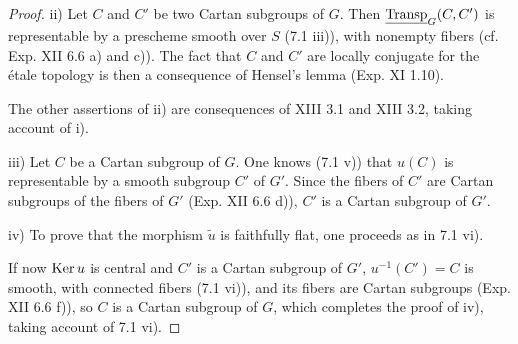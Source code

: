 \begin{proof}
ii) Let $C$ and $C'$ be two Cartan subgroups of $G$. Then $\underline{\operatorname{Transp}}_G(C,C')$ is representable by a prescheme smooth over $S$ (7.1 iii)), with nonempty fibers (cf. Exp. XII 6.6 a) and c)). The fact that $C$ and $C'$ are locally conjugate for the étale topology is then a consequence of Hensel's lemma (Exp. XI 1.10).

The other assertions of ii) are consequences of XIII 3.1 and XIII 3.2, taking account of i).

iii) Let $C$ be a Cartan subgroup of $G$. One knows (7.1 v)) that $u(C)$ is representable by a smooth subgroup $C'$ of $G'$. Since the fibers of $C'$ are Cartan subgroups of the fibers of $G'$ (Exp. XII 6.6 d)), $C'$ is a Cartan subgroup of $G'$.

iv) To prove that the morphism $\widetilde u$ is faithfully flat, one proceeds as in 7.1 vi).

If now $\operatorname{Ker} u$ is central and $C'$ is a Cartan subgroup of $G'$, $u^{-1}(C')=C$ is smooth, with connected fibers (7.1 vi)), and its fibers are Cartan subgroups (Exp. XII 6.6 f)), so $C$ is a Cartan subgroup of $G$, which completes the proof of iv), taking account of 7.1 vi).
\end{proof}
